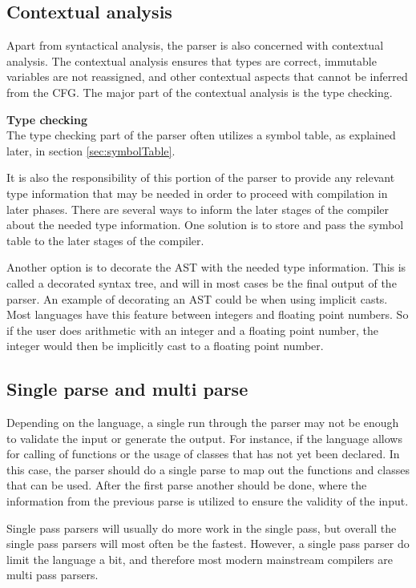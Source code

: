 \subsection{Contextual analysis}
Apart from syntactical analysis, the parser is also concerned with contextual analysis. 
The contextual analysis ensures that types are correct, immutable variables are not reassigned, and other contextual aspects that cannot be inferred from the CFG.
The major part of the contextual analysis is the type checking.

\textbf{Type checking}\\
The type checking part of the parser often utilizes a symbol table, as explained later, in section \ref{sec:symbolTable}.

It is also the responsibility of this portion of the parser to provide any relevant type information that may be needed in order to proceed with compilation in later phases. 
There are several ways to inform the later stages of the compiler about the needed type information. 
One solution is to store and pass the symbol table to the later stages of the compiler. 

Another option is to decorate the AST with the needed type information. 
This is called a decorated syntax tree, and will in most cases be the final output of the parser.
An example of decorating an AST could be when using implicit casts. 
Most languages have this feature between integers and floating point numbers. 
So if the user does arithmetic with an integer and a floating point number, the integer would then be implicitly cast to a floating point number.

\subsection{Single parse and multi parse}
Depending on the language, a single run through the parser may not be enough to validate the input or generate the output. 
For instance, if the language allows for calling of functions or the usage of classes that has not yet been declared.
In this case, the parser should do a single parse to map out the functions and classes that can be used. 
After the first parse another should be done, where the information from the previous parse is utilized to ensure the validity of the input. 

Single pass parsers will usually do more work in the single pass, but overall the single pass parsers will most often be the fastest.
However, a single pass parser do limit the language a bit, and therefore most modern mainstream compilers are multi pass parsers.

